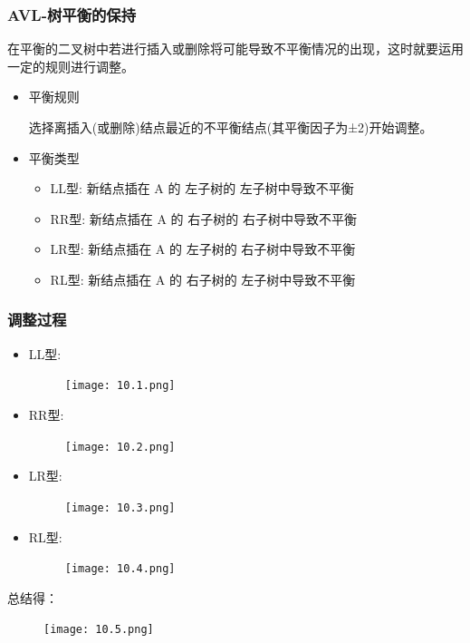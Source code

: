 \documentclass[AutoFakeBold]{LZUThesis2007}
\begin{document}
			\subsubsection{AVL-树平衡的保持} 
			在平衡的二叉树中若进行插入或删除将可能导致不平衡情况的出现，这时就要运用一定的规则进行调整。
			\begin{itemize}
				\item 平衡规则
				
				选择离插入(或删除)结点最近的不平衡结点(其平衡因子为±2)开始调整。
				\item 平衡类型
					\begin{itemize}
						\item LL型: 新结点插在 A 的 左子树的 左子树中导致不平衡
						\item RR型: 新结点插在 A 的 右子树的 右子树中导致不平衡
						\item LR型: 新结点插在 A 的 左子树的 右子树中导致不平衡
						\item RL型: 新结点插在 A 的 右子树的 左子树中导致不平衡
					\end{itemize}
			\end{itemize}		
			\subsubsection{调整过程} 
			\begin{itemize}
				\item LL型:
				\begin{figure}[H]
					\centering
					\texttt{[image: 10.1.png]}
					\label{fig_install_texlive}
				\end{figure}			
				\item RR型:
				\begin{figure}[H]
					\centering
					\texttt{[image: 10.2.png]}
					\label{fig_install_texlive}
				\end{figure}	
				\item LR型:
				\begin{figure}[H]
					\centering
					\texttt{[image: 10.3.png]}
					\label{fig_install_texlive}
				\end{figure}	
				\item RL型:
				\begin{figure}[H]
					\centering
					\texttt{[image: 10.4.png]}
					\label{fig_install_texlive}
				\end{figure}	
			\end{itemize}
			总结得：
			\begin{figure}[H]
				\centering
				\texttt{[image: 10.5.png]}
				\label{fig_install_texlive}
			\end{figure}	
\end{document}
